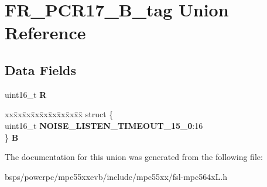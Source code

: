 \hypertarget{unionFR__PCR17__16B__tag}{}\section{F\+R\+\_\+\+P\+C\+R17\+\_\+B\+\_\+tag Union Reference}
\label{unionFR__PCR17__16B__tag}
\subsection*{Data Fields}
\begin{DoxyCompactItemize}
\item 
\mbox{\label{unionFR__PCR17__16B__tag_a44dcdb04b24e7a03339724bae9a4e442}} 
uint16\+\_\+t {\bfseries R}
\item 
\mbox{\label{unionFR__PCR17__16B__tag_aa63f85e62f7c8cb0dd4bce4a30e934f3}} 
\begin{tabbing}
xx\=xx\=xx\=xx\=xx\=xx\=xx\=xx\=xx\=\kill
struct \{\\
\>uint16\_t {\bfseries NOISE\_LISTEN\_TIMEOUT\_15\_0}:16\\
\} {\bfseries B}\\

\end{tabbing}\end{DoxyCompactItemize}


The documentation for this union was generated from the following file\+:\begin{DoxyCompactItemize}
\item 
bsps/powerpc/mpc55xxevb/include/mpc55xx/fsl-\/mpc564x\+L.\+h\end{DoxyCompactItemize}
